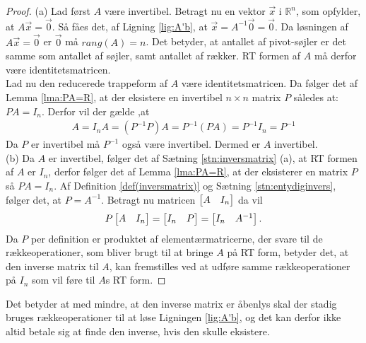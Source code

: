 \begin{proof}
(a) Lad først $A$ være invertibel. 
Betragt nu en vektor $\vec{x}$ i $\mathds{R}^n$, som opfylder, at $A\vec{x}=\vec{0}$.
Så fåes det, af Ligning \eqref{lig:A'b}, at $\vec{x}=A^{-1} \vec{0}=\vec{0}$.
Da løsningen af  $A\vec{x}=\vec{0}$ er $\vec{0}$ må $rang(A)=n$.
Det betyder, at antallet af pivot-søjler er det samme som antallet af søjler, samt antallet af rækker. 
RT formen af $A$ må derfor være identitetsmatricen. 
\\%
Lad nu den reducerede trappeform af $A$ være identitetsmatricen.
Da følger det af Lemma \ref{lma:PA=R}, at der eksistere en invertibel $n \times n$  matrix $P$ således at: $PA=I_n$.
Derfor vil der gælde ,at
\begin{align*}
A=I_nA=(P^{-1}P)A=P^{-1}(PA)=P^{-1}I_n=P^{-1}
\end{align*}
Da $P$ er invertibel må $P^{-1}$ også være invertibel. 
Dermed er $A$ invertibel. 
\\ %
(b) Da $A$ er invertibel, følger det af Sætning \ref{stn:inversmatrix} (a), at RT formen af $A$ er $I_n$, derfor følger det af Lemma \ref{lma:PA=R}, at der eksisterer en matrix $P$ så $PA = I_n$. 
Af Definition \ref{def(inversmatrix)} og Sætning \ref{stn:entydiginvers}, følger det, at $P = A^{-1}$.
Betragt nu matricen $\begin{bmatrix} A&I_n \end{bmatrix}$ da vil
\begin{align*}
P \begin{bmatrix} A & I_n \end{bmatrix} = \begin{bmatrix} I_n & P \end{bmatrix} = \begin{bmatrix} I_n & A^{-1} \end{bmatrix}.
\end{align*}
Da $P$ per definition er produktet af elementærmatricerne, der svare til de rækkeoperationer, som bliver brugt til at bringe $A$ på RT form, betyder det, at den inverse matrix til $A$, kan fremstilles ved at udføre samme rækkeoperationer på $I_n$ som vil føre til $A$s RT form.
\end{proof}
Det betyder at med mindre, at den inverse matrix er åbenlys skal der stadig bruges rækkeoperationer til at løse Ligningen \eqref{lig:A'b}, og det kan derfor ikke altid betale sig at finde den inverse, hvis den skulle eksistere.





